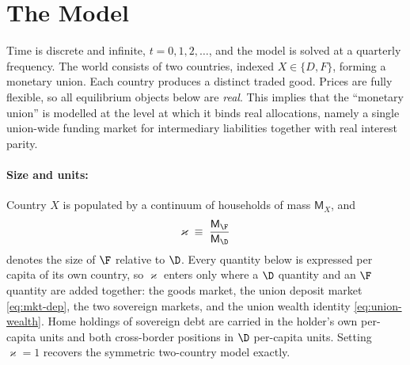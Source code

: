 \section{The Model}
\label{sec:model}


Time is discrete and infinite, $t=0,1,2,\dots$, and the model is solved at a quarterly frequency. The world consists of two countries, indexed $X\in\{D,F\}$, forming a monetary union. Each country produces a distinct traded good. Prices are fully flexible, so all equilibrium objects below are \emph{real}. This implies that the ``monetary union'' is modelled at the level at which it binds real allocations, namely a single union-wide funding market for intermediary liabilities together with real interest parity.

\paragraph{Size and units:}
Country $X$ is populated by a continuum of households of mass $\mathsf{M}_X$, and
\begin{equation}
\varkappa\;\equiv\;\frac{\mathsf{M}_\F}{\mathsf{M}_\D}
\label{eq:size-ratio}
\end{equation}
denotes the size of $\F$ relative to $\D$. Every quantity below is expressed per
capita of its own country, so $\varkappa$ enters only where a $\D$ quantity and an
$\F$ quantity are added together: the goods market, the union deposit market
\eqref{eq:mkt-dep}, the two sovereign markets, and the union wealth identity
\eqref{eq:union-wealth}. Home holdings of sovereign debt are carried in the
holder's own per-capita units and both cross-border positions in $\D$ per-capita
units. Setting $\varkappa=1$ recovers the symmetric two-country model exactly.


